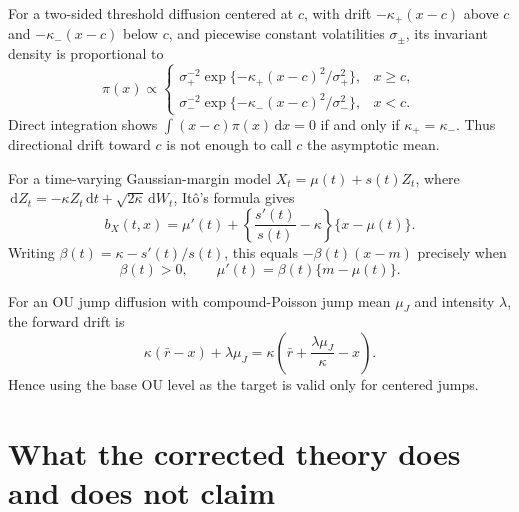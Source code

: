 \documentclass[11pt]{article}
\theoremstyle{remark}
\newcommand{\dd}{\,\mathrm d}
\begin{document}
For a two-sided threshold diffusion centered at $c$, with drift
$-\kappa_+(x-c)$ above $c$ and $-\kappa_-(x-c)$ below $c$, and piecewise
constant volatilities $\sigma_\pm$, its invariant density is proportional to
\begin{equation}
\pi(x)\propto
\begin{cases}
\sigma_+^{-2}\exp\{-\kappa_+(x-c)^2/\sigma_+^2\},&x\ge c,\\
\sigma_-^{-2}\exp\{-\kappa_-(x-c)^2/\sigma_-^2\},&x<c.
\end{cases}
\label{rev:threshold-invariant}
\end{equation}
Direct integration shows $\int(x-c)\pi(x)\dd x=0$ if and only if
$\kappa_+=\kappa_-$.  Thus directional drift toward $c$ is not enough to call
$c$ the asymptotic mean.

For a time-varying Gaussian-margin model
$X_t=\mu(t)+s(t)Z_t$, where
$\dd Z_t=-\kappa Z_t\dd t+\sqrt{2\kappa}\dd W_t$, It\^o's formula gives
\begin{equation}
b_X(t,x)=\mu'(t)+\left\{\frac{s'(t)}{s(t)}-\kappa\right\}
\{x-\mu(t)\}.
\label{rev:timevarying-normal-drift}
\end{equation}
Writing $\beta(t)=\kappa-s'(t)/s(t)$, this equals
$-\beta(t)(x-m)$ precisely when
\begin{equation}
\beta(t)>0,\qquad
\mu'(t)=\beta(t)\{m-\mu(t)\}.
\label{rev:timevarying-normal-MR-condition}
\end{equation}

For an OU jump diffusion with compound-Poisson jump mean $\mu_J$ and intensity
$\lambda$, the forward drift is
\begin{equation}
\kappa(\bar r-x)+\lambda\mu_J
=\kappa\left(\bar r+\frac{\lambda\mu_J}{\kappa}-x\right).
\label{rev:jump-OU-target}
\end{equation}
Hence using the base OU level as the target is valid only for centered jumps.

\section{What the corrected theory does and does not claim}
\end{document}
